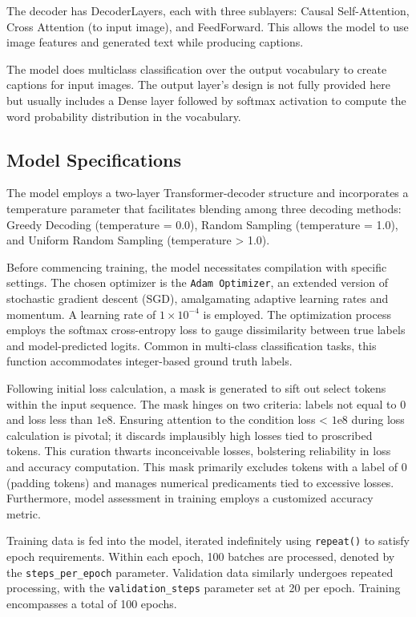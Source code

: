 \documentclass[lettersize,journal]{IEEEtran}
\begin{document}
The decoder has DecoderLayers, each with three sublayers: Causal Self-Attention, Cross Attention (to input image), and FeedForward. This allows the model to use image features and generated text while producing captions.

The model does multiclass classification over the output vocabulary to create captions for input images. The output layer's design is not fully provided here but usually includes a Dense layer followed by softmax activation to compute the word probability distribution in the vocabulary.

\subsection{Model Specifications}

The model employs a two-layer Transformer-decoder structure and incorporates a temperature parameter that facilitates blending among three decoding methods: Greedy Decoding (temperature = 0.0), Random Sampling (temperature = 1.0), and Uniform Random Sampling (temperature > 1.0).

Before commencing training, the model necessitates compilation with specific settings. The chosen optimizer is the \texttt{Adam Optimizer}, an extended version of stochastic gradient descent (SGD), amalgamating adaptive learning rates and momentum. A learning rate of $1 \times 10^{-4}$ is employed. The optimization process employs the softmax cross-entropy loss to gauge dissimilarity between true labels and model-predicted logits. Common in multi-class classification tasks, this function accommodates integer-based ground truth labels.

Following initial loss calculation, a mask is generated to sift out select tokens within the input sequence. The mask hinges on two criteria: labels not equal to 0 and loss less than $1 \mathrm{e} 8$. Ensuring attention to the condition loss < $1 \mathrm{e} 8$ during loss calculation is pivotal; it discards implausibly high losses tied to proscribed tokens. This curation thwarts inconceivable losses, bolstering reliability in loss and accuracy computation. This mask primarily excludes tokens with a label of 0 (padding tokens) and manages numerical predicaments tied to excessive losses. Furthermore, model assessment in training employs a customized accuracy metric.

Training data is fed into the model, iterated indefinitely using \texttt{repeat()} to satisfy epoch requirements. Within each epoch, 100 batches are processed, denoted by the \texttt{steps\_per\_epoch} parameter. Validation data similarly undergoes repeated processing, with the \texttt{validation\_steps} parameter set at 20 per epoch. Training encompasses a total of 100 epochs.
\end{document}
